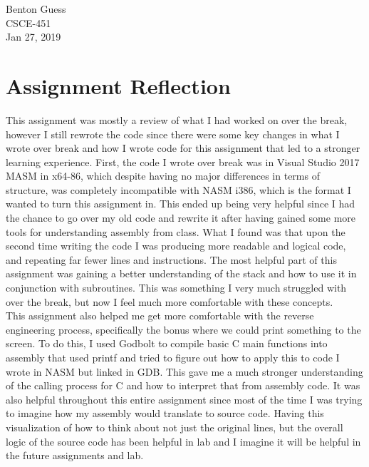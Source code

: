 \documentclass[11pt]{article}
\begin{document}
    \begin{flushright}
        Benton Guess \\
        CSCE-451 \\
        Jan 27, 2019 \\
    \end{flushright}
\RaggedRight

\section*{Assignment Reflection}
This assignment was mostly a review of what I had worked on over the break, however I still rewrote the code since there were some key changes in what I wrote over break and how I wrote code for this assignment that led to a stronger learning experience. First, the code I wrote over break was in Visual Studio 2017 MASM in x64-86, which despite having no major differences in terms of structure, was completely incompatible with NASM i386, which is the format I wanted to turn this assignment in. This ended up being very helpful since I had the chance to go over my old code and rewrite it after having gained some more tools for understanding assembly from class. What I found was that upon the second time writing the code I was producing more readable and logical code, and repeating far fewer lines and instructions. The most helpful part of this assignment was gaining a better understanding of the stack and how to use it in conjunction with subroutines. This was something I very much struggled with over the break, but now I feel much more comfortable with these concepts. \\

This assignment also helped me get more comfortable with the reverse engineering process, specifically the bonus where we could print something to the screen. To do this, I used Godbolt to compile basic C main functions into assembly that used printf and tried to figure out how to apply this to code I wrote in NASM but linked in GDB. This gave me a much stronger understanding of the calling process for C and how to interpret that from assembly code. It was also helpful throughout this entire assignment since most of the time I was trying to imagine how my assembly would translate to source code. Having this visualization of how to think about not just the original lines, but the overall logic of the source code has been helpful in lab and I imagine it will be helpful in the future assignments and lab.\\
\end{document}
